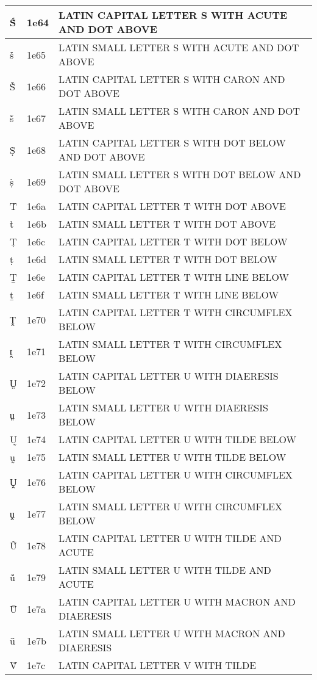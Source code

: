 \documentclass[12pt,letterpaper,openany]{book}
\begin{document}
\begin{center}
\begin{supertabular}{|m{0.25in}|m{0.5in}|m{4in}|}
			Ṥ & 1e64 & LATIN CAPITAL LETTER S WITH ACUTE AND DOT ABOVE\\\hline
			ṥ & 1e65 & LATIN SMALL LETTER S WITH ACUTE AND DOT ABOVE\\\hline
			Ṧ & 1e66 & LATIN CAPITAL LETTER S WITH CARON AND DOT ABOVE\\\hline
			ṧ & 1e67 & LATIN SMALL LETTER S WITH CARON AND DOT ABOVE\\\hline
			Ṩ & 1e68 & LATIN CAPITAL LETTER S WITH DOT BELOW AND DOT ABOVE\\\hline
			ṩ & 1e69 & LATIN SMALL LETTER S WITH DOT BELOW AND DOT ABOVE\\\hline
			Ṫ & 1e6a & LATIN CAPITAL LETTER T WITH DOT ABOVE\\\hline
			ṫ & 1e6b & LATIN SMALL LETTER T WITH DOT ABOVE\\\hline
			Ṭ & 1e6c & LATIN CAPITAL LETTER T WITH DOT BELOW\\\hline
			ṭ & 1e6d & LATIN SMALL LETTER T WITH DOT BELOW\\\hline
			Ṯ & 1e6e & LATIN CAPITAL LETTER T WITH LINE BELOW\\\hline
			ṯ & 1e6f & LATIN SMALL LETTER T WITH LINE BELOW\\\hline
			Ṱ & 1e70 & LATIN CAPITAL LETTER T WITH CIRCUMFLEX BELOW\\\hline
			ṱ & 1e71 & LATIN SMALL LETTER T WITH CIRCUMFLEX BELOW\\\hline
			Ṳ & 1e72 & LATIN CAPITAL LETTER U WITH DIAERESIS BELOW\\\hline
			ṳ & 1e73 & LATIN SMALL LETTER U WITH DIAERESIS BELOW\\\hline
			Ṵ & 1e74 & LATIN CAPITAL LETTER U WITH TILDE BELOW\\\hline
			ṵ & 1e75 & LATIN SMALL LETTER U WITH TILDE BELOW\\\hline
			Ṷ & 1e76 & LATIN CAPITAL LETTER U WITH CIRCUMFLEX BELOW\\\hline
			ṷ & 1e77 & LATIN SMALL LETTER U WITH CIRCUMFLEX BELOW\\\hline
			Ṹ & 1e78 & LATIN CAPITAL LETTER U WITH TILDE AND ACUTE\\\hline
			ṹ & 1e79 & LATIN SMALL LETTER U WITH TILDE AND ACUTE\\\hline
			Ṻ & 1e7a & LATIN CAPITAL LETTER U WITH MACRON AND DIAERESIS\\\hline
			ṻ & 1e7b & LATIN SMALL LETTER U WITH MACRON AND DIAERESIS\\\hline
			Ṽ & 1e7c & LATIN CAPITAL LETTER V WITH TILDE\\\hline

\end{supertabular}
\end{center}
\end{document}
